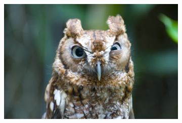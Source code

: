 {\begin{figure}[htbp]
    \centering
  \begin{subfigure}[b]{0.8\textwidth}
        \includegraphics[width= \textwidth]{./Figs/placeholder.jpeg}
    \end{subfigure}



\end{figure}}
